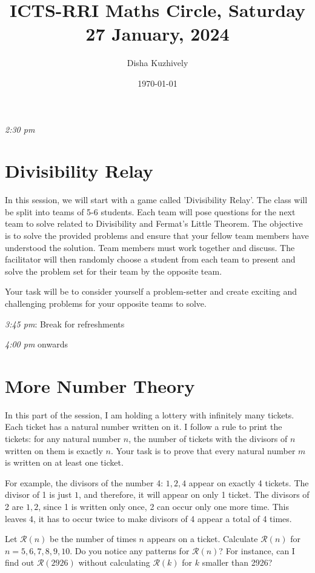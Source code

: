 \documentclass[a4paper,12pt]{article}
\title{ICTS-RRI Maths Circle, Saturday 27 January, 2024}
\author{Disha Kuzhively}
\date{\today}
\begin{document}
\maketitle
\emph{2:30 pm}
\section*{Divisibility Relay}
In this session, we will start with a game called 'Divisibility Relay'. The class will be split into teams of 5-6 students. Each team will pose questions for the next team to solve related to Divisibility and Fermat's Little Theorem. The objective is to solve the provided problems and ensure that your fellow team members have understood the solution. Team members must work together and discuss. The facilitator will then randomly choose a student from each team to present and solve the problem set for their team by the opposite team.

Your task will be to consider yourself a problem-setter and create exciting and challenging problems for your opposite teams to solve.

\emph{3:45 pm}: Break for refreshments

\emph{4:00 pm} onwards



\section*{More Number Theory}

In this part of the session, I am holding a lottery with infinitely many tickets. Each ticket has a natural number written on it. I follow a rule to print the tickets: for any natural number $n$, the number of tickets with the divisors of $n$ written on them is exactly $n$. Your task is to prove that every natural number $m$ is written on at least one ticket.

For example, the divisors of the number 4: ${1,2,4}$ appear on exactly 4 tickets. The divisor of 1 is just ${1}$, and therefore, it will appear on only 1 ticket. The divisors of 2 are ${1,2}$, since 1 is written only once, 2 can occur only one more time. This leaves 4, it has to occur twice to make divisors of 4 appear a total of 4 times. 

Let $\mathcal{R}(n)$ be the number of times $n$ appears on a ticket. Calculate $\mathcal{R}(n)$ for $n = 5, 6, 7, 8, 9, 10$. Do you notice any patterns for $\mathcal{R}(n)$? For instance, can I find out $\mathcal{R}(2926)$ without calculating $\mathcal{R}(k)$ for $k$ smaller than 2926?
\end{document}
